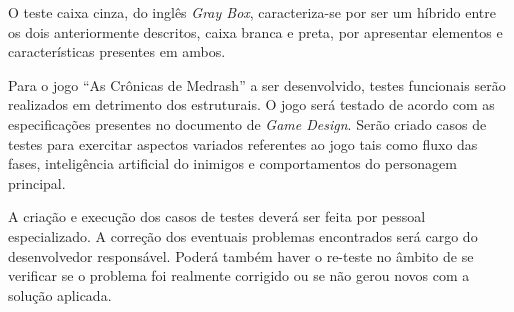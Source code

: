 O teste caixa cinza, do inglês \textit{Gray Box}, caracteriza-se por ser um híbrido entre os dois anteriormente descritos, caixa branca e preta, por apresentar elementos e características presentes em ambos.

Para o jogo ``As Crônicas de Medrash'' a ser desenvolvido, testes funcionais serão realizados em detrimento dos estruturais. O jogo será testado de acordo com as especificações presentes no documento de \textit{Game Design}. Serão criado casos de testes para exercitar aspectos variados referentes ao jogo tais como fluxo das fases, inteligência artificial do inimigos e comportamentos do personagem principal.
 
A criação e execução dos casos de testes deverá ser feita por pessoal especializado. A correção dos eventuais problemas encontrados será cargo do desenvolvedor responsável. Poderá também haver o re-teste no âmbito de se verificar se o problema foi realmente corrigido ou se não gerou novos com a solução aplicada.
